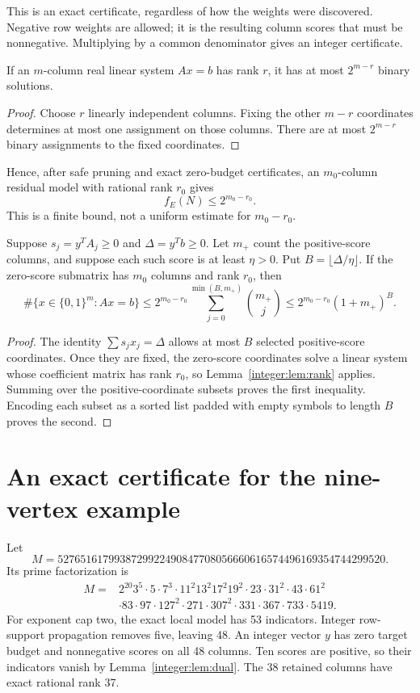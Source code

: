 This is an exact certificate, regardless of how the weights were discovered. Negative row weights are allowed; it is the resulting column scores that must be nonnegative. Multiplying by a common denominator gives an integer certificate.

\begin{lemma}\label{integer:lem:rank}
If an $m$-column real linear system $Ax=b$ has rank $r$, it has at most $2^{m-r}$ binary solutions.
\end{lemma}
\begin{proof}
Choose $r$ linearly independent columns. Fixing the other $m-r$ coordinates determines at most one assignment on those columns. There are at most $2^{m-r}$ binary assignments to the fixed coordinates.
\end{proof}

Hence, after safe pruning and exact zero-budget certificates, an $m_0$-column residual model with rational rank $r_0$ gives
\[
 \boxed{f_E(N)\le2^{m_0-r_0}.}
\]
This is a finite bound, not a uniform estimate for $m_0-r_0$.

\begin{proposition}\label{integer:prop:budget}
Suppose $s_j=y^TA_j\ge0$ and $\Delta=y^Tb\ge0$. Let $m_+$ count the positive-score columns, and suppose each such score is at least $\eta>0$. Put $B=\lfloor\Delta/\eta\rfloor$. If the zero-score submatrix has $m_0$ columns and rank $r_0$, then
\[
 \#\{x\in\{0,1\}^m:Ax=b\}
 \le 2^{m_0-r_0}\sum_{j=0}^{\min(B,m_+)}\binom{m_+}{j}
 \le 2^{m_0-r_0}(1+m_+)^B.
\]
\end{proposition}
\begin{proof}
The identity $\sum s_jx_j=\Delta$ allows at most $B$ selected positive-score coordinates. Once they are fixed, the zero-score coordinates solve a linear system whose coefficient matrix has rank $r_0$, so Lemma~\ref{integer:lem:rank} applies. Summing over the positive-coordinate subsets proves the first inequality. Encoding each subset as a sorted list padded with empty symbols to length $B$ proves the second.
\end{proof}


\section{An exact certificate for the nine-vertex example}
Let
\[
 M=5276516179938729922490847708056660616574496169354744299520.
\]
Its prime factorization is
\begin{align*}
 M={}&2^{20}3^5\cdot5\cdot7^3\cdot11^2 13^2 17^2 19^2\cdot23\cdot31^2\cdot43\cdot61^2\\
 &\cdot83\cdot97\cdot127^2\cdot271\cdot307^2\cdot331\cdot367\cdot733\cdot5419.
\end{align*}
For exponent cap two, the exact local model has 53 indicators. Integer row-support propagation removes five, leaving 48. An integer vector $y$ has zero target budget and nonnegative scores on all 48 columns. Ten scores are positive, so their indicators vanish by Lemma~\ref{integer:lem:dual}. The 38 retained columns have exact rational rank 37.

